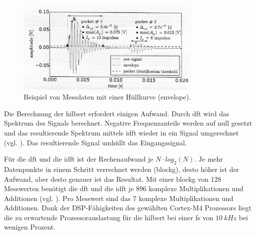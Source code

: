 \begin{figure}
	\centering
		\includegraphics[width=0.8\textwidth]{images/curve_wsl.png}
	\caption{Beispiel von Messdaten mit einer Hüllkurve (envelope).}
	\label{fig.wslcurve}
\end{figure}

Die Berechnung der \gls{hilbert} erfordert einigen Aufwand. Durch \gls{dft} wird das Spektrum des Signals berechnet. Negative Frequenzanteile werden auf null gesetzt und das resultierende Spektrum mittels \gls{idft} wieder in ein Signal umgerechnet (vgl. \cite{wiki_hilbert}). Das resultierende Signal umhüllt das Eingangssignal. 

Für die \gls{dft} und die \gls{idft} ist der Rechenaufwand je \ensuremath{N \cdot log_2(N)}. Je mehr Datenpunkte in einem Schritt verrechnet werden (\gls{blockg}), desto höher ist der Aufwand, aber desto genauer ist das Resultat. Mit einer \gls{blockg} von 128 Messwerten benötigt die \gls{dft} und die \gls{idft} je 896 komplexe Multiplikationen und Additionen (vgl. \cite[Kap. 3, S. 48]{dsv1_hilbert}). Pro Messwert sind das 7 komplexe Multiplikationen und Additionen. Dank der DSP-Fähigkeiten des gewählten Cortex\texttrademark -M4 Prozessors liegt die zu erwartende Prozessorauslastung für die \gls{hilbert} bei einer \gls{fs} von \ensuremath{10~kHz} bei wenigen Prozent.

